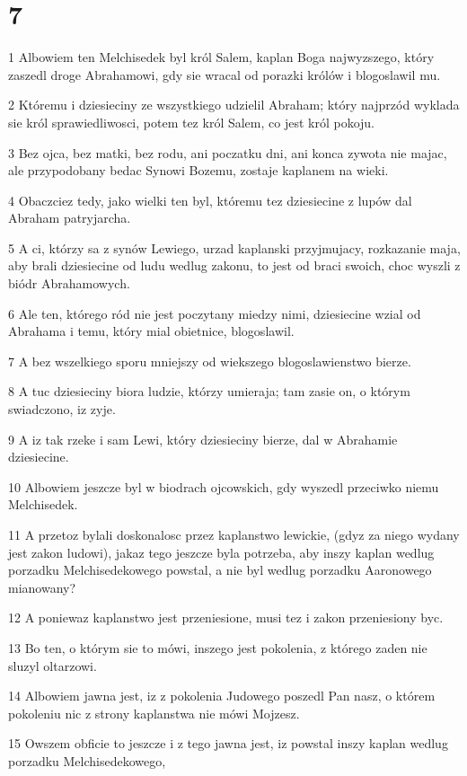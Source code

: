 \chapter{7}

\par 1 Albowiem ten Melchisedek byl król Salem, kaplan Boga najwyzszego, który zaszedl droge Abrahamowi, gdy sie wracal od porazki królów i blogoslawil mu.
\par 2 Któremu i dziesieciny ze wszystkiego udzielil Abraham; który najprzód wyklada sie król sprawiedliwosci, potem tez król Salem, co jest król pokoju.
\par 3 Bez ojca, bez matki, bez rodu, ani poczatku dni, ani konca zywota nie majac, ale przypodobany bedac Synowi Bozemu, zostaje kaplanem na wieki.
\par 4 Obaczciez tedy, jako wielki ten byl, któremu tez dziesiecine z lupów dal Abraham patryjarcha.
\par 5 A ci, którzy sa z synów Lewiego, urzad kaplanski przyjmujacy, rozkazanie maja, aby brali dziesiecine od ludu wedlug zakonu, to jest od braci swoich, choc wyszli z biódr Abrahamowych.
\par 6 Ale ten, którego ród nie jest poczytany miedzy nimi, dziesiecine wzial od Abrahama i temu, który mial obietnice, blogoslawil.
\par 7 A bez wszelkiego sporu mniejszy od wiekszego blogoslawienstwo bierze.
\par 8 A tuc dziesieciny biora ludzie, którzy umieraja; tam zasie on, o którym swiadczono, iz zyje.
\par 9 A iz tak rzeke i sam Lewi, który dziesieciny bierze, dal w Abrahamie dziesiecine.
\par 10 Albowiem jeszcze byl w biodrach ojcowskich, gdy wyszedl przeciwko niemu Melchisedek.
\par 11 A przetoz bylali doskonalosc przez kaplanstwo lewickie, (gdyz za niego wydany jest zakon ludowi), jakaz tego jeszcze byla potrzeba, aby inszy kaplan wedlug porzadku Melchisedekowego powstal, a nie byl wedlug porzadku Aaronowego mianowany?
\par 12 A poniewaz kaplanstwo jest przeniesione, musi tez i zakon przeniesiony byc.
\par 13 Bo ten, o którym sie to mówi, inszego jest pokolenia, z którego zaden nie sluzyl oltarzowi.
\par 14 Albowiem jawna jest, iz z pokolenia Judowego poszedl Pan nasz, o którem pokoleniu nic z strony kaplanstwa nie mówi Mojzesz.
\par 15 Owszem obficie to jeszcze i z tego jawna jest, iz powstal inszy kaplan wedlug porzadku Melchisedekowego,
